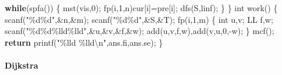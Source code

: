 \documentclass[
]{article}
\newenvironment{Shaded}{}{}
\newcommand{\ControlFlowTok}[1]{\textcolor[rgb]{0.00,0.44,0.13}{\textbf{#1}}}
\newcommand{\DataTypeTok}[1]{\textcolor[rgb]{0.56,0.13,0.00}{#1}}
\newcommand{\DecValTok}[1]{\textcolor[rgb]{0.25,0.63,0.44}{#1}}
\newcommand{\NormalTok}[1]{#1}
\newcommand{\SpecialCharTok}[1]{\textcolor[rgb]{0.25,0.44,0.63}{#1}}
\newcommand{\StringTok}[1]{\textcolor[rgb]{0.25,0.44,0.63}{#1}}
\begin{document}
\begin{Shaded}
\begin{Highlighting}[]
    \ControlFlowTok{while}\NormalTok{(spfa())}
\NormalTok{    \{}
\NormalTok{        mst(vis,}\DecValTok{0}\NormalTok{);}
\NormalTok{        fp(i,}\DecValTok{1}\NormalTok{,n)cur[i]=pre[i];   }
\NormalTok{        dfs(S,linf);}
\NormalTok{    \}}
\NormalTok{\}}
\DataTypeTok{int}\NormalTok{ work()}
\NormalTok{\{}
\NormalTok{    scanf(}\StringTok{"}\SpecialCharTok{\%d\%d}\StringTok{"}\NormalTok{,\&n,\&m); scanf(}\StringTok{"}\SpecialCharTok{\%d\%d}\StringTok{"}\NormalTok{,\&S,\&T);}
\NormalTok{    fp(i,}\DecValTok{1}\NormalTok{,m)}
\NormalTok{    \{}
        \DataTypeTok{int}\NormalTok{ u,v; LL f,w;}
\NormalTok{        scanf(}\StringTok{"}\SpecialCharTok{\%d\%d\%lld\%lld}\StringTok{"}\NormalTok{,\&u,\&v,\&f,\&w);}
\NormalTok{        add(u,v,f,w),add(v,u,}\DecValTok{0}\NormalTok{,{-}w);}
\NormalTok{    \}}
\NormalTok{    mcf();}
    \ControlFlowTok{return}\NormalTok{ printf(}\StringTok{"}\SpecialCharTok{\%lld}\StringTok{ }\SpecialCharTok{\%lld\textbackslash{}n}\StringTok{"}\NormalTok{,ans.fi,ans.se);}
\NormalTok{\}}
\end{Highlighting}
\end{Shaded}

\hypertarget{dijkstra}{%
\paragraph{Dijkstra}\label{dijkstra}}
\end{document}
